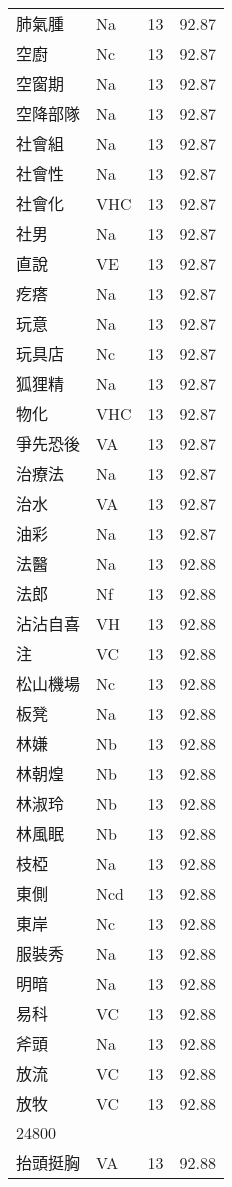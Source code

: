 \documentclass[twocolumn]{book}
\begin{document}
\begin{supertabular}{llrr}
肺氣腫 & Na & 13 &  92.87\\
空廚 & Nc & 13 &  92.87\\
空窗期 & Na & 13 &  92.87\\
空降部隊 & Na & 13 &  92.87\\
社會組 & Na & 13 &  92.87\\
社會性 & Na & 13 &  92.87\\
社會化 & VHC & 13 &  92.87\\
社男 & Na & 13 &  92.87\\
直說 & VE & 13 &  92.87\\
疙瘩 & Na & 13 &  92.87\\
玩意 & Na & 13 &  92.87\\
玩具店 & Nc & 13 &  92.87\\
狐狸精 & Na & 13 &  92.87\\
物化 & VHC & 13 &  92.87\\
爭先恐後 & VA & 13 &  92.87\\
治療法 & Na & 13 &  92.87\\
治水 & VA & 13 &  92.87\\
油彩 & Na & 13 &  92.87\\
法醫 & Na & 13 &  92.88\\
法郎 & Nf & 13 &  92.88\\
沾沾自喜 & VH & 13 &  92.88\\
注 & VC & 13 &  92.88\\
松山機場 & Nc & 13 &  92.88\\
板凳 & Na & 13 &  92.88\\
林嫌 & Nb & 13 &  92.88\\
林朝煌 & Nb & 13 &  92.88\\
林淑玲 & Nb & 13 &  92.88\\
林風眠 & Nb & 13 &  92.88\\
枝椏 & Na & 13 &  92.88\\
東側 & Ncd & 13 &  92.88\\
東岸 & Nc & 13 &  92.88\\
服裝秀 & Na & 13 &  92.88\\
明暗 & Na & 13 &  92.88\\
易科 & VC & 13 &  92.88\\
斧頭 & Na & 13 &  92.88\\
放流 & VC & 13 &  92.88\\
放牧 & VC & 13 &  92.88\\
24800\\
抬頭挺胸 & VA & 13 &  92.88\\

\end{supertabular}
\end{document}
